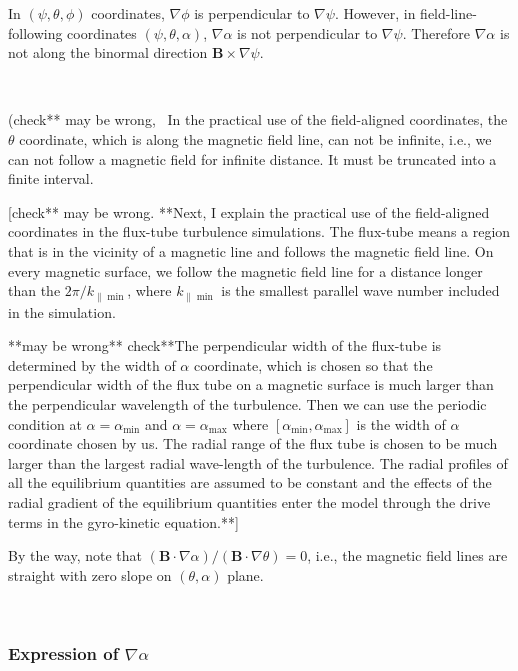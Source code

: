\documentclass{article}
\begin{document}
In $(\psi, \theta, \phi)$ coordinates, $\nabla \phi$ is perpendicular to
$\nabla \psi$. However, in field-line-following coordinates $(\psi, \theta,
\alpha)$, $\nabla \alpha$ is not perpendicular to $\nabla \psi$. Therefore
$\nabla \alpha$ is not along the binormal direction $\mathbf{B} \times \nabla
\psi$.

\

(check** may be wrong, \ In the practical use of the field-aligned
coordinates, the $\theta$ coordinate, which is along the magnetic field line,
can not be infinite, i.e., we can not follow a magnetic field for infinite
distance. It must be truncated into a finite interval.

[check** may be wrong. **Next, I explain the practical use of the
field-aligned coordinates in the flux-tube turbulence simulations. The
flux-tube means a region that is in the vicinity of a magnetic line and
follows the magnetic field line. On every magnetic surface, we follow the
magnetic field line for a distance longer than the $2 \pi / k_{\parallel
\min}$, where $k_{\parallel \min}$ is the smallest parallel wave number
included in the simulation.

**may be wrong** check**The perpendicular width of the flux-tube is
determined by the width of $\alpha$ coordinate, which is chosen so that the
perpendicular width of the flux tube on a magnetic surface is much larger than
the perpendicular wavelength of the turbulence. Then we can use the periodic
condition at $\alpha = \alpha_{\min}$ and $\alpha = \alpha_{\max}$ where
$[\alpha_{\min}, \alpha_{\max}]$ is the width of $\alpha$ coordinate chosen by
us. The radial range of the flux tube is chosen to be much larger than the
largest radial wave-length of the turbulence. The radial profiles of all the
equilibrium quantities are assumed to be constant and the effects of the
radial gradient of the equilibrium quantities enter the model through the
drive terms in the gyro-kinetic equation.**]

By the way, note that $(\mathbf{B} \cdot \nabla \alpha) / (\mathbf{B} \cdot
\nabla \theta) = 0$, i.e., the magnetic field lines are straight with zero
slope on $(\theta, \alpha)$ plane.

\

\subsubsection{Expression of $\nabla \alpha$}
\end{document}
